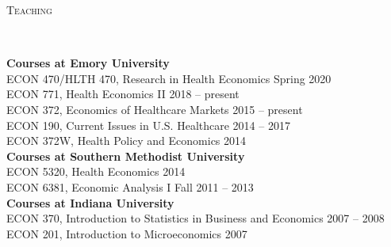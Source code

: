 \documentclass[9pt]{article}
\newenvironment{changemargin}[2]{%
  \begin{list}{}{%
    \setlength{\topsep}{0pt}%
    \setlength{\leftmargin}{#1}%
    \setlength{\rightmargin}{#2}%
    \setlength{\listparindent}{\parindent}%
    \setlength{\itemindent}{\parindent}%
    \setlength{\parsep}{\parskip}%
  }%
  \item[]}{\end{list}
}
\newcommand{\lineover}{
	\begin{changemargin}{-0.05in}{-0.05in}
		\vspace*{-8pt}
		\hrulefill \\
		\vspace*{-2pt}
	\end{changemargin}
}
\newcommand{\header}[1]{
	\begin{changemargin}{-0.5in}{-0.5in}
		\scshape{#1}\\
  	\lineover
	\end{changemargin}
}
\newenvironment{body} {
	\vspace*{-16pt}
	\begin{changemargin}{-0.25in}{-0.5in}
  }	
	{\end{changemargin}
}
\begin{document}
\header{Teaching}
\begin{body}
 \vspace{14pt}
 \textbf{Courses at Emory University} \\
 ECON 470/HLTH 470, Research in Health Economics \hfill Spring 2020 \\
 ECON 771, Health Economics II \hfill 2018 -- present \\
 ECON 372, Economics of Healthcare Markets \hfill 2015 -- present \\
 ECON 190, Current Issues in U.S. Healthcare \hfill 2014 -- 2017 \\
 ECON 372W, Health Policy and Economics \hfill 2014 \\

 \medskip
 \textbf{Courses at Southern Methodist University} \\
 ECON 5320, Health Economics \hfill 2014 \\
 ECON 6381, Economic Analysis I \hfill Fall 2011 -- 2013 \\

 \medskip
 \textbf{Courses at Indiana University} \\
 ECON 370, Introduction to Statistics in Business and Economics \hfill 2007 -- 2008 \\
 ECON 201, Introduction to Microeconomics \hfill 2007 \\

\end{body}
\smallskip
\end{document}
